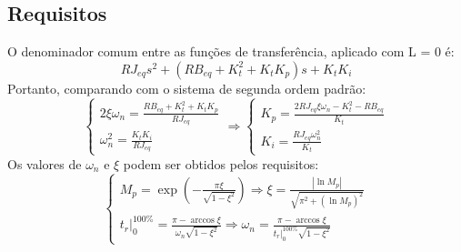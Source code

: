 \documentclass{article}[twocolumn]
\begin{document}
	\subsection{Requisitos}
	O denominador comum entre as fun\c{c}\~oes de transfer\^encia, aplicado com L = 0 \'e:
	\begin{equation}
		RJ_{eq}s^2 + (RB_{eq} + K_t^2 + K_tK_p)s + K_tK_i
		\nonumber
	\end{equation}
	Portanto, comparando com o sistema de segunda ordem padr\~ao:
	\begin{equation}
		\left\{\begin{array}{l}
			2\xi\omega_n = \frac{RB_{eq} + K_t^2 + K_tK_p}{RJ_{eq}}\\
			\omega_n^2 = \frac{K_tK_i}{RJ_{eq}}
		\end{array}\right. \Rightarrow
		\left\{\begin{array}{l}
			K_p = \frac{2RJ_{eq}\xi\omega_n - K_t^2 - RB_{eq}}{K_t}\\
			K_i = \frac{RJ_{eq}\omega_n^2}{K_t}
		\end{array}\right.
		\label{eq:k_pi}
	\end{equation}
	Os valores de $\omega_n$ e $\xi$ podem ser obtidos pelos requisitos:
	\begin{equation}
		\left\{\begin{array}{l}
			M_p = \exp{\left(-\frac{\pi\xi}{\sqrt{1 - \xi^2}}\right)} \Rightarrow
			\xi = \frac{|\ln M_p|}{\sqrt{\pi^2 + (\ln M_p)^2}}\\
			t_r\big|_{0}^{100\%} = \frac{\pi - \arccos{\xi}}{\omega_n\sqrt{1 - \xi^2}} \Rightarrow
			\omega_n = \frac{\pi - \arccos{\xi}}{t_r\big|_{0}^{100\%}\sqrt{1 - \xi^2}}
		\end{array}\right.
		\nonumber
	\end{equation}
\end{document}
